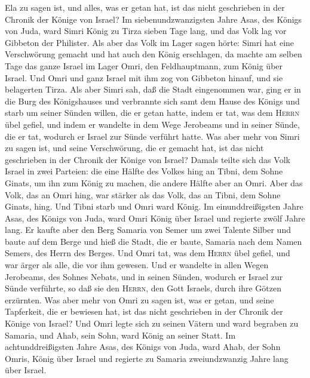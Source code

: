 Ela zu sagen ist, und alles, was er getan hat, ist das nicht geschrieben
in der Chronik der Könige von Israel?  Im
siebenundzwanzigsten Jahre Asas, des Königs von Juda, ward Simri König
zu Tirza sieben Tage lang, und das Volk lag vor Gibbeton der Philister.
 Als aber das Volk im Lager sagen hörte: Simri hat eine
Verschwörung gemacht und hat auch den König erschlagen, da machte am
selben Tage das ganze Israel im Lager Omri, den Feldhauptmann, zum König
über Israel.  Und Omri und ganz Israel mit ihm zog von
Gibbeton hinauf, und sie belagerten Tirza.  Als aber
Simri sah, daß die Stadt eingenommen war, ging er in die Burg des
Königshauses und verbrannte sich samt dem Hause des Königs
 und starb um seiner Sünden willen, die er getan hatte,
indem er tat, was dem \textsc{Herrn} übel gefiel, und indem er wandelte
in dem Wege Jerobeams und in seiner Sünde, die er tat, wodurch er Israel
zur Sünde verführt hatte.  Was aber mehr von Simri zu
sagen ist, und seine Verschwörung, die er gemacht hat, ist das nicht
geschrieben in der Chronik der Könige von Israel?  Damals
teilte sich das Volk Israel in zwei Parteien: die eine Hälfte des Volkes
hing an Tibni, dem Sohne Ginats, um ihn zum König zu machen, die andere
Hälfte aber an Omri.  Aber das Volk, das an Omri hing,
war stärker als das Volk, das an Tibni, dem Sohne Ginats, hing. Und
Tibni starb und Omri ward König.  Im einunddreißigsten
Jahre Asas, des Königs von Juda, ward Omri König über Israel und
regierte zwölf Jahre lang.  Er kaufte aber den Berg
Samaria von Semer um zwei Talente Silber und baute auf dem Berge und
hieß die Stadt, die er baute, Samaria nach dem Namen Semers, des Herrn
des Berges.  Und Omri tat, was dem \textsc{Herrn} übel
gefiel, und war ärger als alle, die vor ihm gewesen.  Und
er wandelte in allen Wegen Jerobeams, des Sohnes Nebats, und in seinen
Sünden, wodurch er Israel zur Sünde verführte, so daß sie den
\textsc{Herrn}, den Gott Israels, durch ihre Götzen erzürnten.
 Was aber mehr von Omri zu sagen ist, was er getan, und
seine Tapferkeit, die er bewiesen hat, ist das nicht geschrieben in der
Chronik der Könige von Israel?  Und Omri legte sich zu
seinen Vätern und ward begraben zu Samaria, und Ahab, sein Sohn, ward
König an seiner Statt.  Im achtunddreißigsten Jahre Asas,
des Königs von Juda, ward Ahab, der Sohn Omris, König über Israel und
regierte zu Samaria zweiundzwanzig Jahre lang über Israel.

